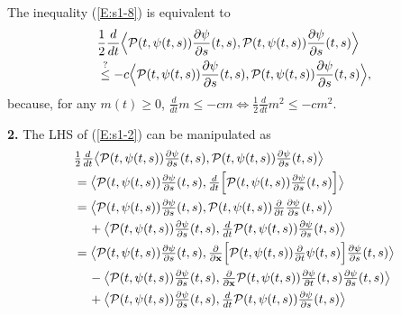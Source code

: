 The inequality (\ref{E:s1-8}) is equivalent to
\begin{align}
    &\frac{1}{2} \frac{d}{d t} \Big\langle \mathcal P(t, \psi(t, s)) \frac{\partial\psi}{\partial s}(t, s), \mathcal P(t, \psi(t, s)) \frac{\partial\psi}{\partial s}(t, s) \Big\rangle \notag \\
    &\overset{?}{\leq} -c \Big\langle \mathcal P(t, \psi(t, s)) \frac{\partial\psi}{\partial s}(t, s), \mathcal P(t, \psi(t, s)) \frac{\partial\psi}{\partial s}(t, s) \Big\rangle, \label{E:s1-2}
\end{align}
because, for any $m(t) \geq 0$, $\frac{d}{d t} m \leq -c m \Leftrightarrow \frac{1}{2} \frac{d}{d t} m^2 \leq -c m^2$.

\noindent \textbf{2.} The LHS of (\ref{E:s1-2}) can be manipulated as
\begin{align}
    &\textstyle \frac{1}{2} \frac{d}{d t} \big\langle \mathcal P(t, \psi(t, s)) \frac{\partial\psi}{\partial s}(t, s), \mathcal P(t, \psi(t, s)) \frac{\partial\psi}{\partial s}(t, s) \big\rangle \notag \\
    &= \textstyle \big\langle \mathcal P(t, \psi(t, s)) \frac{\partial\psi}{\partial s}(t, s), \frac{d}{d t} \Big[\mathcal P(t, \psi(t, s)) \frac{\partial\psi}{\partial s}(t, s) \Big] \big\rangle \notag \\
    &= \textstyle \big\langle \mathcal P(t, \psi(t, s)) \frac{\partial\psi}{\partial s}(t, s), \mathcal P(t, \psi(t, s)) \frac{\partial}{\partial t} \frac{\partial\psi}{\partial s}(t, s) \big\rangle \notag \\
    &\quad\, \textstyle + \big\langle \mathcal P(t, \psi(t, s)) \frac{\partial\psi}{\partial s}(t, s), \frac{d}{d t} \mathcal P(t, \psi(t, s)) \frac{\partial\psi}{\partial s}(t, s) \big\rangle \notag \\
    &= \textstyle \big\langle \mathcal P(t, \psi(t, s)) \frac{\partial\psi}{\partial s}(t, s), \frac{\partial}{\partial \vect x} \Big[\mathcal P(t, \psi(t, s)) \frac{\partial}{\partial t} \psi(t, s) \Big] \frac{\partial\psi}{\partial s}(t, s) \big\rangle \notag \\
    &\quad\, \textstyle - \big\langle \mathcal P(t, \psi(t, s)) \frac{\partial\psi}{\partial s}(t, s), \frac{\partial}{\partial \vect x} \mathcal P(t, \psi(t, s)) \frac{\partial \psi}{\partial t}(t, s) \frac{\partial\psi}{\partial s}(t, s) \big\rangle \notag \\
    &\quad\, \textstyle + \big\langle \mathcal P(t, \psi(t, s)) \frac{\partial\psi}{\partial s}(t, s), \frac{d}{d t} \mathcal P(t, \psi(t, s)) \frac{\partial\psi}{\partial s}(t, s) \big\rangle \label{E:s1-9} \\

\end{align}
